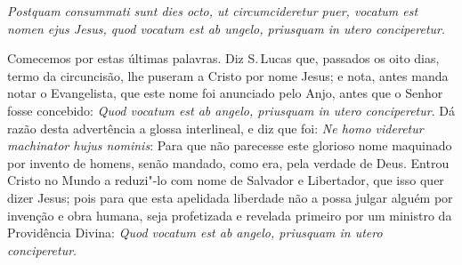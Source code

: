 \emph{Postquam consummati sunt dies octo, ut circumcideretur puer,
vocatum est nomen ejus Jesus, quod vocatum est ab ungelo, priusquam in
utero conciperetur}.

Comecemos por estas últimas palavras.
Diz S.\,Lucas que, passados os oito dias, termo da circuncisão, lhe
puseram a Cristo por nome Jesus; e nota, antes manda notar o
Evangelista, que este nome foi anunciado pelo Anjo, antes que o Senhor
fosse concebido: \emph{Quod vocatum est ab angelo, priusquam in utero
conciperetur}. Dá razão desta advertência a glossa interlineal, e diz
que foi: \emph{Ne homo videretur machinator hujus nominis}: Para que
não parecesse este glorioso nome maquinado por invento de homens, senão
mandado, como era, pela verdade de Deus. Entrou Cristo no Mundo a
reduzi"-lo com nome de Salvador e Libertador, que isso quer dizer Jesus;
pois para que esta apelidada liberdade não a possa julgar alguém por
invenção e obra humana, seja profetizada e revelada primeiro por um
ministro da Providência Divina: \emph{Quod vocatum est ab angelo,
priusquam in utero conciperetur}.

